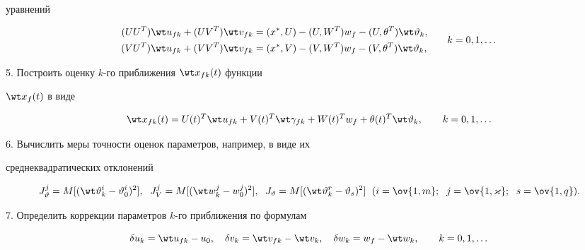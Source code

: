 уравнений 


\begin{equation} 


\begin{split} 


(U U^T)\wt u_{fk}+(U V^T)\wt v_{fk}&= 


(x^*,U)-(U,W^T)w_f-(U,\theta^T)\wt\vartheta_k,\\ 


(V U^T)\wt u_{fk}+(V V^T)\wt v_{fk}&= 


(x^*,V)-(V,W^T)w_f-(V,\theta^T)\wt\vartheta_k,


\end{split} 


\qquad k=0,1,\dotsc 


\end{equation} 


 


5. Построить оценку $k$-го приближения $\wt x_{fk}(t)$ функции 


$\wt x_f(t)$ в виде 


\begin{equation} 


\wt x_{fk}(t)=U(t)^T\wt u_{fk}+V(t)^T\wt\gamma_{fk}+ 


W(t)^T w_f+\theta(t)^T\wt\vartheta_k,\qquad k=0,1,\dotsc 


\end{equation} 


 


6. Вычислить меры точности оценок параметров, например, в виде их 


среднеквадратических отклонений 


\begin{equation}  


J^j_\vartheta=M[(\wt\vartheta^i_k-\vartheta^i_0)^2],\ \;


J^j_V=M[(\wt w^j_k-w^j_0)^2],\ \;


J_\vartheta=M[(\wt\vartheta^r_k-\vartheta_s)^2]\ \;


(i=\ov{1,m};\ \;j=\ov{1,\varkappa};\ \;s=\ov{1,q}). 


\end{equation}  


 


7. Определить коррекции параметров $k$-го приближения по формулам 


\begin{equation} 


\delta u_k=\wt u_{fk}-u_0,\quad 


\delta v_k=\wt v_{fk}-\wt v_k,\quad 


\delta w_k=w_f-\wt w_k,\qquad k=0,1,\dotsc


\end{equation} 


